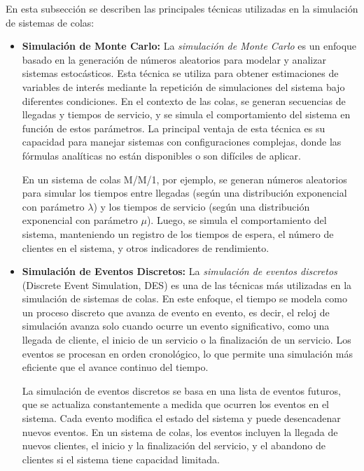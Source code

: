\documentclass{article}
\begin{document}
En esta subsección se describen las principales técnicas utilizadas en la simulación de sistemas de colas:

\begin{itemize}
    \item \textbf{Simulación de Monte Carlo:}  
    La \textit{simulación de Monte Carlo} es un enfoque basado en la generación de números aleatorios para modelar y analizar sistemas estocásticos. Esta técnica se utiliza para obtener estimaciones de variables de interés mediante la repetición de simulaciones del sistema bajo diferentes condiciones. En el contexto de las colas, se generan secuencias de llegadas y tiempos de servicio, y se simula el comportamiento del sistema en función de estos parámetros. La principal ventaja de esta técnica es su capacidad para manejar sistemas con configuraciones complejas, donde las fórmulas analíticas no están disponibles o son difíciles de aplicar.

    En un sistema de colas M/M/1, por ejemplo, se generan números aleatorios para simular los tiempos entre llegadas (según una distribución exponencial con parámetro \( \lambda \)) y los tiempos de servicio (según una distribución exponencial con parámetro \( \mu \)). Luego, se simula el comportamiento del sistema, manteniendo un registro de los tiempos de espera, el número de clientes en el sistema, y otros indicadores de rendimiento.

    \item \textbf{Simulación de Eventos Discretos:}  
    La \textit{simulación de eventos discretos} (Discrete Event Simulation, DES) es una de las técnicas más utilizadas en la simulación de sistemas de colas. En este enfoque, el tiempo se modela como un proceso discreto que avanza de evento en evento, es decir, el reloj de simulación avanza solo cuando ocurre un evento significativo, como una llegada de cliente, el inicio de un servicio o la finalización de un servicio. Los eventos se procesan en orden cronológico, lo que permite una simulación más eficiente que el avance continuo del tiempo.

    La simulación de eventos discretos se basa en una lista de eventos futuros, que se actualiza constantemente a medida que ocurren los eventos en el sistema. Cada evento modifica el estado del sistema y puede desencadenar nuevos eventos. En un sistema de colas, los eventos incluyen la llegada de nuevos clientes, el inicio y la finalización del servicio, y el abandono de clientes si el sistema tiene capacidad limitada.


\end{itemize}
\end{document}
